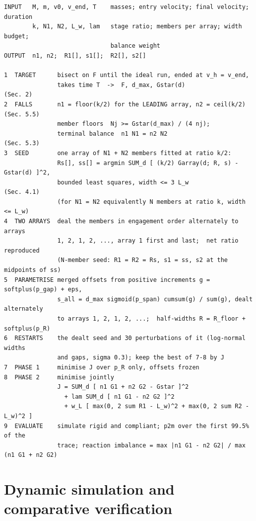 \documentclass[preprint,12pt,number]{elsarticle}
\begin{document}
\begin{algobox}
\vspace{-4pt}
\begin{Verbatim}[fontsize=\scriptsize]
INPUT   M, m, v0, v_end, T    masses; entry velocity; final velocity; duration
        k, N1, N2, L_w, lam   stage ratio; members per array; width budget;
                              balance weight
OUTPUT  n1, n2;  R1[], s1[];  R2[], s2[]

1  TARGET      bisect on F until the ideal run, ended at v_h = v_end,
               takes time T  ->  F, d_max, Gstar(d)                   (Sec. 2)
2  FALLS       n1 = floor(k/2) for the LEADING array, n2 = ceil(k/2)  (Sec. 5.5)
               member floors  Nj >= Gstar(d_max) / (4 nj);
               terminal balance  n1 N1 = n2 N2                        (Sec. 5.3)
3  SEED        one array of N1 + N2 members fitted at ratio k/2:
               Rs[], ss[] = argmin SUM_d [ (k/2) Garray(d; R, s) - Gstar(d) ]^2,
               bounded least squares, width <= 3 L_w                  (Sec. 4.1)
               (for N1 = N2 equivalently N members at ratio k, width <= L_w)
4  TWO ARRAYS  deal the members in engagement order alternately to arrays
               1, 2, 1, 2, ..., array 1 first and last;  net ratio reproduced
               (N-member seed: R1 = R2 = Rs, s1 = ss, s2 at the midpoints of ss)
5  PARAMETRISE merged offsets from positive increments g = softplus(p_gap) + eps,
               s_all = d_max sigmoid(p_span) cumsum(g) / sum(g), dealt alternately
               to arrays 1, 2, 1, 2, ...;  half-widths R = R_floor + softplus(p_R)
6  RESTARTS    the dealt seed and 30 perturbations of it (log-normal widths
               and gaps, sigma 0.3); keep the best of 7-8 by J
7  PHASE 1     minimise J over p_R only, offsets frozen
8  PHASE 2     minimise jointly
               J = SUM_d [ n1 G1 + n2 G2 - Gstar ]^2
                 + lam SUM_d [ n1 G1 - n2 G2 ]^2
                 + w_L [ max(0, 2 sum R1 - L_w)^2 + max(0, 2 sum R2 - L_w)^2 ]
9  EVALUATE    simulate rigid and compliant; p2m over the first 99.5% of the
               trace; reaction imbalance = max |n1 G1 - n2 G2| / max (n1 G1 + n2 G2)
\end{Verbatim}
\end{algobox}

\section{Dynamic simulation and comparative verification}
\label{sec:sim}
\end{document}
